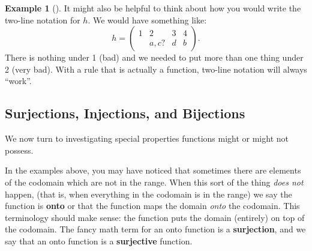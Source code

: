 \documentclass[10pt,]{book}
\newcommand{\terminology}[1]{\textbf{#1}}
\theoremstyle{plain}
\theoremstyle{definition}
\newtheorem{example}[theorem]{Example}
\theoremstyle{definition}
\theoremstyle{definition}
\numberwithin{equation}{chapter}
\newcommand{\amp}{ & }
\begin{document}
\begin{example}[]
          It might also be helpful to think about how you would write the two-line notation for \(h\). We would have something like:
          \begin{equation*}
            h=\begin{pmatrix} 1 \amp 2 \amp 3 \amp 4 \\ \amp a,c? \amp d \amp b\end{pmatrix}.
          \end{equation*}
          There is nothing under 1 (bad) and we needed to put more than one thing under 2 (very bad). With a rule that is actually a function, two-line notation will always ``work''.
\end{example}
\typeout{************************************************}
\typeout{************************************************}
\subsection[Surjections, Injections, and Bijections]{Surjections, Injections, and Bijections}\label{subsec_surj-inj-bij}

      We now turn to investigating special properties functions might or might not possess.
\par

      In the examples above, you may have noticed that sometimes there are elements of the codomain which are not in the range. When this sort of the thing \emph{does not} happen, (that is, when everything in the codomain is in the range) we say the function is
      \terminology{onto} or that the function maps the domain \emph{onto} the codomain. This terminology should make sense: the function puts the domain (entirely) on top of the codomain. The fancy math term for an onto function is a
      \terminology{surjection}, and we say that an onto function is a
      \terminology{surjective} function.
\par
\end{document}
